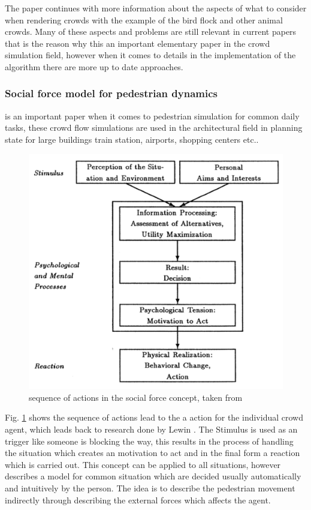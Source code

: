 \documentclass[sigconf]{acmart}
\begin{document}
The paper continues with more information about the aspects of what to consider when rendering crowds with the example of the bird flock and other animal crowds. Many of these aspects and problems are still relevant in current papers that is the reason why this an important elementary paper in the crowd simulation field, however when it comes to details in the implementation of the algorithm there are more up to date approaches. 

\subsubsection{Social force model for pedestrian dynamics}\cite{helbing_social_1995} is an important paper when it comes to pedestrian simulation for common daily tasks, these crowd flow simulations are used in the architectural field in planning state for large buildings train station, airports, shopping centers etc.. 
\begin{figure}[h]
  \centering
  \includegraphics[width=1\linewidth]{images/helbingSocialForceConceptScheme.png}
  \caption{sequence of actions in the social force concept, taken from \cite{helbing_social_1995}}
  \label{fig:helbingSchema}
\end{figure}
Fig. \ref{fig:helbingSchema} shows the sequence of actions lead to the a action for the individual crowd agent, which leads back to research done by Lewin \cite{lewin_field_1951}. The Stimulus is used as an trigger like someone is blocking the way, this results in the process of handling the situation which creates an motivation to act and in the final form a reaction which is carried out. This concept can be applied to all situations, \cite{helbing_social_1995} however describes a model for common situation which are decided usually automatically and intuitively by the person. The idea is to describe the pedestrian movement indirectly through describing the external forces which affects the agent. 
\end{document}
